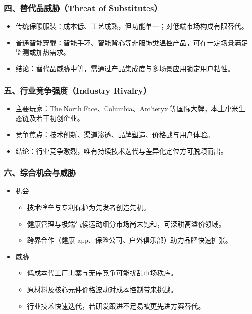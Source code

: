 \documentclass[UTF8]{report}
\theoremstyle{MyLineTheoremStyle} %
\theoremstyle{MyBlockTheoremStyle} %
\theoremstyle{MySubsubsectionStyle} %
\begin{document}
  \subsubsection{四、替代品威胁（Threat of Substitutes）}
    \begin{itemize}
      \item 传统保暖服装：成本低、工艺成熟，但功能单一；对低端市场构成有限替代。  
      \item 普通智能穿戴：智能手环、智能背心等非服饰类温控产品，可在一定场景满足监测或加热需求。  
      \item 结论：替代品威胁中等，需通过产品集成度与多场景应用锁定用户粘性。
    \end{itemize}

  \subsubsection{五、行业竞争强度（Industry Rivalry）}
    \begin{itemize}
      \item 主要玩家：The North Face、Columbia、Arc’teryx 等国际大牌，本土小米生态链及若干初创企业。  
      \item 竞争焦点：技术创新、渠道渗透、品牌塑造、价格战与用户体验。  
      \item 结论：行业竞争激烈，唯有持续技术迭代与差异化定位方可脱颖而出。
    \end{itemize}

\subsubsection{六、综合机会与威胁}
\begin{itemize}
  \item 机会  
    \begin{itemize}
      \item 技术壁垒与专利保护为先发者创造先机。  
      \item 健康管理与极端气候运动细分市场尚未饱和，可深耕高溢价领域。  
      \item 跨界合作（健康 app、保险公司、户外俱乐部）助力品牌快速扩张。
    \end{itemize}
  \item 威胁  
    \begin{itemize}
      \item 低成本代工厂山寨与无序竞争可能扰乱市场秩序。  
      \item 原材料及核心元件价格波动对成本控制带来挑战。  
      \item 行业技术快速迭代，若研发跟进不足易被更先进方案替代。
    \end{itemize}
\end{itemize}
\end{document}
